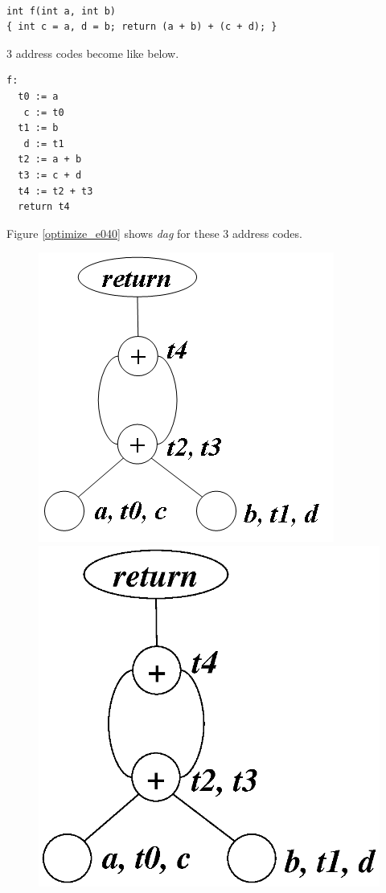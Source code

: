 \begin{Example}
\label{optimize_e039}
\begin{verbatim}

int f(int a, int b)
{ int c = a, d = b; return (a + b) + (c + d); }
\end{verbatim}
3 address codes become like below.
\begin{verbatim}
f:
  t0 := a
   c := t0
  t1 := b
   d := t1
  t2 := a + b
  t3 := c + d
  t4 := t2 + t3
  return t4
\end{verbatim}
Figure \ref{optimize_e040} shows {\em dag} for these 3 address codes.
\begin{figure}[htbp]
\begin{center}
\begin{htmlonly}
\includegraphics[width=0.724\linewidth,height=0.7\linewidth]{opt021.png}
\end{htmlonly}
\begin{latexonly}
\includegraphics[width=0.724\linewidth,height=0.7\linewidth]{opt021.eps}

\end{latexonly}
\end{center}
\end{figure}
\end{Example}
